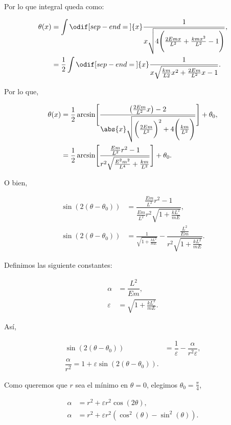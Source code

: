 \documentclass[../main.tex]{subfiles}
\begin{document}
Por lo que integral queda como:

\begin{align*}
	\theta(x) & = \int \odif[sep-end=\medspace]{x} \dfrac{1}{x\sqrt{4 \Biggl(\tfrac{2Emx}{L^{2}} + \tfrac{kmx^{2}}{L^{2}} - 1\Biggr)}}, \\
	          & = \dfrac{1}{2}\int \odif[sep-end=\medspace]{x} \dfrac{1}{x\sqrt{\tfrac{km}{L2}x^{2} + \tfrac{2Em}{L^{2}}x - 1}}.
\end{align*}

Por lo que,

\begin{align*}
	\theta(x) & = \dfrac{1}{2}\arcsin \Biggl[\dfrac{\bigl(\tfrac{2Em}{L^{2}}x\bigr) - 2}{\abs{x}\sqrt{\biggl(\tfrac{2Em}{L^{2}}\biggr)^{2} + 4 \Biggl(\tfrac{km}{L^{2}}\Biggr)}}\Biggr] + \theta_{0}, \\
	          & = \dfrac{1}{2} \arcsin \Biggl[\dfrac{\tfrac{Em}{L^{2}}r^{2} - 1}{r^{2}\sqrt{\tfrac{E^{2}m^{2}}{L^{4}} + \tfrac{km}{L^{2}}}}\Biggr] + \theta_{0}.
\end{align*}

O bien,

\begin{align*}
	\sin(2(\theta - \theta_{0})) & = \dfrac{\tfrac{Em}{L^{2}}r^{2} - 1}{\tfrac{Em}{L^{2}}r^{2}\sqrt{1 + \tfrac{kL^{2}}{mE}}},                  \\
	\sin(2(\theta - \theta_{0})) & = \tfrac{1}{\sqrt{1 + \tfrac{kL^{2}}{mE}}} - \dfrac{\tfrac{L^{2}}{Em}}{r^{2}\sqrt{1 + \tfrac{kL^{2}}{mE}}}.
\end{align*}

Definimos las siguiente constantes:

\begin{align}
	\alpha      & = \dfrac{L^{2}}{Em},             \\
	\varepsilon & = \sqrt{1 + \tfrac{kL^{2}}{mE}}.
\end{align}

Así,

\begin{align*}
	\sin(2(\theta - \theta_{0})) & = \dfrac{1}{\varepsilon} - \dfrac{\alpha}{r^{2}\varepsilon}, \\
	\dfrac{\alpha}{r^{2}} = 1 + \varepsilon\sin(2(\theta - \theta_{0})).
\end{align*}

Como queremos que \(r\) sea el mínimo en \(\theta = 0\), elegimos
\(\theta_{0} = \tfrac{\pi}{4}\),

\begin{align*}
	\alpha & = r^{2} + \varepsilon r^{2}\cos(2\theta),                         \\
	\alpha & = r^{2} + \varepsilon r^{2}(\cos^{2}(\theta) - \sin^{2}(\theta)).
\end{align*}
\end{document}
